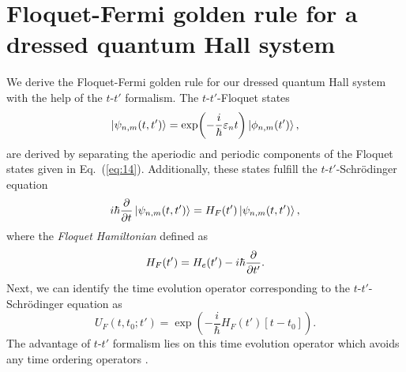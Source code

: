 \documentclass[
 reprint,
 amsmath,amssymb,
 aps,
 prb,
]{revtex4-2}
\begin{document}
\section{\label{appendix_c} Floquet-Fermi golden rule for a dressed quantum  Hall system}

We derive the Floquet-Fermi golden rule for our dressed quantum Hall system with the help of the $t$-$t'$ formalism. The $t$-$t'$-Floquet states \cite{grifoni98,wackerl20}
\begin{equation} \label{eq:c1}
  \ket{\psi_{n,m}(t,t')} =
  \exp(-\frac{i}{\hbar}\varepsilon_{n} t)\ket{\phi_{n,m}(t')},
\end{equation}
are derived by separating the aperiodic and periodic components of the Floquet states given in Eq.~(\ref{eq:14}). Additionally, these states fulfill the $t$-$t'$-Schrödinger equation \cite{grifoni98,wackerl20}
\begin{equation} \label{eq:c2}
  i \hbar \pdv{t}\ket{\psi_{n,m}(t,t')} =
  H_F(t') \ket{\psi_{n,m}(t,t')},
\end{equation}
where the \textit{Floquet Hamiltonian} defined as
\begin{equation} \label{eq:c3}
  H_F(t') =
  H_e(t') - i\hbar \pdv{t'}.
\end{equation}
Next, we can identify the time evolution operator corresponding to the $t$-$t'$-Schrödinger equation as
\begin{equation} \label{eq:c4}
  U_F(t,t_0;t') = \exp(-\frac{i}{\hbar}H_F(t')\left[t-t_0 \right]).
\end{equation}
The advantage of $t$-$t'$ formalism lies on this time evolution operator which avoids any time ordering operators \cite{wackerl20}.
\end{document}
